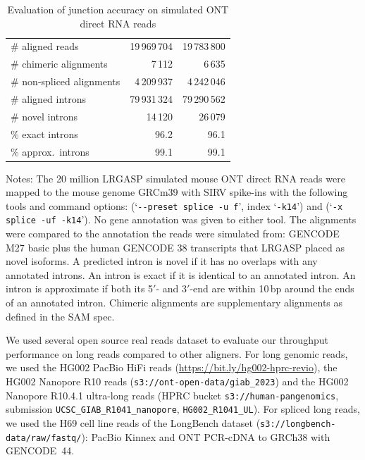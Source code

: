 \begin{table}[t]
\caption{Evaluation of junction accuracy on simulated ONT direct RNA reads}
\label{tab:rna}
\footnotesize
\begin{tabular*}{\columnwidth}{@{\extracolsep{\fill}}lrr@{}}
\toprule
 & \flash{} & \mmtwo{}\\
\midrule
\# aligned reads & 19\,969\,704 & 19\,783\,800\\
\# chimeric alignments & 7\,112 & 6\,635\\
\# non-spliced alignments & 4\,209\,937 & 4\,242\,046\\
\# aligned introns & 79\,931\,324 & 79\,290\,562\\
\# novel introns & 14\,120 & 26\,079\\
\% exact introns & 96.2 & 96.1\\
\% approx.\ introns & 99.1 & 99.1\\
\bottomrule
\end{tabular*}
\par\smallskip
{\scriptsize\noindent Notes: The 20 million LRGASP simulated mouse ONT direct RNA reads \citep{pardopalacios2024lrgasp} were mapped to the mouse genome GRCm39 with SIRV spike-ins with the following tools and command options: \flash{} (`\texttt{-{}-preset splice -u f}', index `\texttt{-k14}') and \mmtwo{} (`\texttt{-x splice -uf -k14}'). No gene annotation was given to either tool. The alignments were compared to the annotation the reads were simulated from: GENCODE M27 basic plus the human GENCODE 38 transcripts that LRGASP placed as novel isoforms. A predicted intron is novel if it has no overlaps with any annotated introns. An intron is exact if it is identical to an annotated intron. An intron is approximate if both its 5$'$- and 3$'$-end are within 10\,bp around the ends of an annotated intron. Chimeric alignments are supplementary alignments as defined in the SAM spec.\par}
\end{table}

We used several open source real reads dataset to evaluate our throughput performance on long reads compared to other aligners. For long genomic reads, we used the HG002 PacBio HiFi reads (\url{https://bit.ly/hg002-hprc-revio}), the HG002 Nanopore R10 reads (\nolinkurl{s3://ont-open-data/giab_2023}) and the HG002 Nanopore R10.4.1 ultra-long reads (HPRC bucket \nolinkurl{s3://human-pangenomics}, submission \texttt{UCSC\_GIAB\_R1041\_nanopore}, \texttt{HG002\_R1041\_UL}). For spliced long reads, we used the H69 cell line reads of the LongBench dataset \citep{you2025longbench} (\nolinkurl{s3://longbench-data/raw/fastq/}): PacBio Kinnex and ONT PCR-cDNA to GRCh38 with GENCODE~44.

